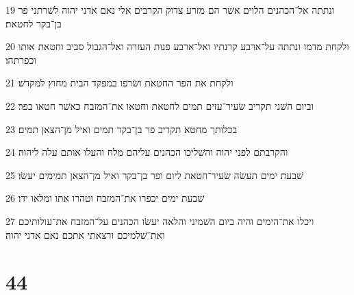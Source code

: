 \par 19 ונתתה אל־הכהנים הלוים אשׁר הם מזרע צדוק הקרבים אלי נאם אדני יהוה לשׁרתני פר בן־בקר לחטאת׃
\par 20 ולקחת מדמו ונתתה על־ארבע קרנתיו ואל־ארבע פנות העזרה ואל־הגבול סביב וחטאת אותו וכפרתהו׃
\par 21 ולקחת את הפר החטאת ושׂרפו במפקד הבית מחוץ למקדשׁ׃
\par 22 וביום השׁני תקריב שׂעיר־עזים תמים לחטאת וחטאו את־המזבח כאשׁר חטאו בפר׃
\par 23 בכלותך מחטא תקריב פר בן־בקר תמים ואיל מן־הצאן תמים׃
\par 24 והקרבתם לפני יהוה והשׁליכו הכהנים עליהם מלח והעלו אותם עלה ליהוה׃
\par 25 שׁבעת ימים תעשׂה שׂעיר־חטאת ליום ופר בן־בקר ואיל מן־הצאן תמימים יעשׂו׃
\par 26 שׁבעת ימים יכפרו את־המזבח וטהרו אתו ומלאו ידו׃
\par 27 ויכלו את־הימים והיה ביום השׁמיני והלאה יעשׂו הכהנים על־המזבח את־עולותיכם ואת־שׁלמיכם ורצאתי אתכם נאם אדני יהוה׃

\chapter{44}

